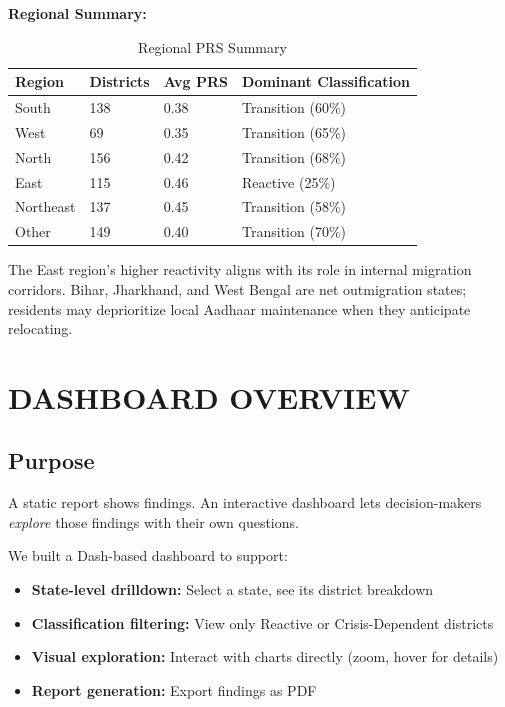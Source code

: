 \documentclass[11pt, a4paper]{article}
\begin{document}
\textbf{Regional Summary:}


\vspace{0.8em}
\begin{table}[H]
\caption{Regional PRS Summary}
{\small
\begin{tabularx}{\textwidth}{|Y|Y|Y|Y|}
\hline
\textbf{Region} & \textbf{Districts} & \textbf{Avg PRS} & \textbf{Dominant Classification} \\ \hline
South & 138 & 0.38 & Transition (60\%) \\ \hline
West & 69 & 0.35 & Transition (65\%) \\ \hline
North & 156 & 0.42 & Transition (68\%) \\ \hline
East & 115 & 0.46 & Reactive (25\%) \\ \hline
Northeast & 137 & 0.45 & Transition (58\%) \\ \hline
Other & 149 & 0.40 & Transition (70\%) \\ \hline
\end{tabularx}
}
\end{table}
\vspace{1em}

The East region's higher reactivity aligns with its role in internal migration corridors. Bihar, Jharkhand, and West Bengal are net outmigration states; residents may deprioritize local Aadhaar maintenance when they anticipate relocating.




\section{DASHBOARD OVERVIEW}

\subsection{Purpose}

A static report shows findings. An interactive dashboard lets decision-makers \textit{explore} those findings with their own questions.


We built a Dash-based dashboard to support:


\begin{itemize}
\item \textbf{State-level drilldown:} Select a state, see its district breakdown

\item \textbf{Classification filtering:} View only Reactive or Crisis-Dependent districts

\item \textbf{Visual exploration:} Interact with charts directly (zoom, hover for details)

\item \textbf{Report generation:} Export findings as PDF
\end{itemize}
\end{document}
